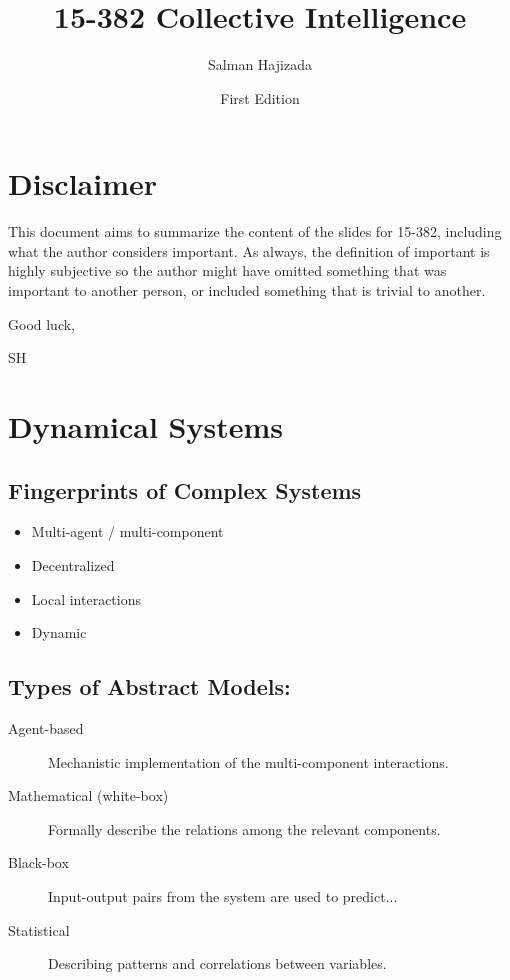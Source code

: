 \documentclass{report}
\title{15-382 Collective Intelligence}
\date{First Edition}
\author{Salman Hajizada}
\begin{document}
\maketitle

\setcounter{chapter}{-1}
\chapter*{Disclaimer}
This document aims to summarize the content of the slides for 15-382, including 
what the author considers important. As always, the definition of important is 
highly subjective so the author might have omitted something that was 
important to another person, or included something that is trivial to another.


Good luck,

SH
\chapter*{Dynamical Systems}

\section*{Fingerprints of Complex Systems}

\begin{itemize}
    \item Multi-agent / multi-component 
    \item Decentralized 
    \item Local interactions 
    \item Dynamic
\end{itemize}

\section*{Types of Abstract Models:}

\begin{description}
    \item[Agent-based] Mechanistic implementation of the multi-component interactions.
    \item[Mathematical (white-box)] Formally describe the relations among the relevant components. 
    \item[Black-box] Input-output pairs from the system are used to predict...
    \item[Statistical] Describing patterns and correlations between variables.
\end{description}
\end{document}
